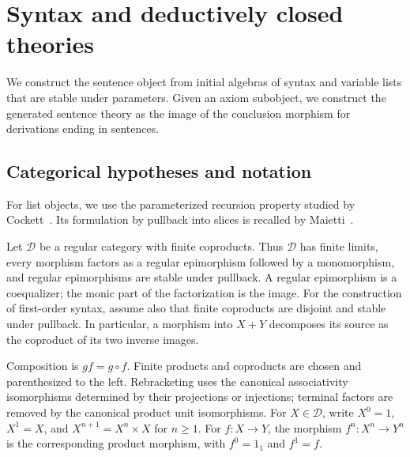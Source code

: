 \section{Syntax and deductively closed theories}
\label{app:syntax-theories}
\label{app:fork-proofs}

We construct the sentence object from initial algebras of syntax and
variable lists that are stable under parameters. Given an axiom
subobject, we construct the generated sentence theory as the image
of the conclusion morphism for derivations ending in sentences.

\subsection{Categorical hypotheses and notation}
\label{app:categorical-hypotheses}

For list objects, we use the parameterized recursion property studied by
Cockett~\cite[Lemma 2.2 and Definition 2.3]{CockettLists}.
Its formulation by pullback into slices is
recalled by Maietti~\cite[Definition 2.4 and the following paragraph]{MaiettiLists}.

Let $\mathcal D$ be a regular category with finite coproducts.
Thus $\mathcal D$ has finite limits, every morphism factors as a
regular epimorphism followed by a monomorphism, and regular
epimorphisms are stable under pullback. A regular epimorphism is a
coequalizer; the monic part of the factorization is the image.
For the construction of first-order syntax, assume also that finite
coproducts are disjoint and stable under pullback. In particular,
a morphism into $X+Y$ decomposes its source as the coproduct of its
two inverse images.

Composition is $gf=g\circ f$. Finite products and coproducts are
chosen and parenthesized to the left. Rebracketing uses the canonical
associativity isomorphisms determined by their projections or injections;
terminal factors are removed by the canonical product unit isomorphisms.
For $X\in\mathcal D$, write $X^0=1$, $X^1=X$, and
$X^{n+1}=X^n\times X$ for $n\geq1$.
For $f:X\to Y$, the morphism $f^n:X^n\to Y^n$ is the corresponding
product morphism, with $f^0=1_1$ and $f^1=f$.

